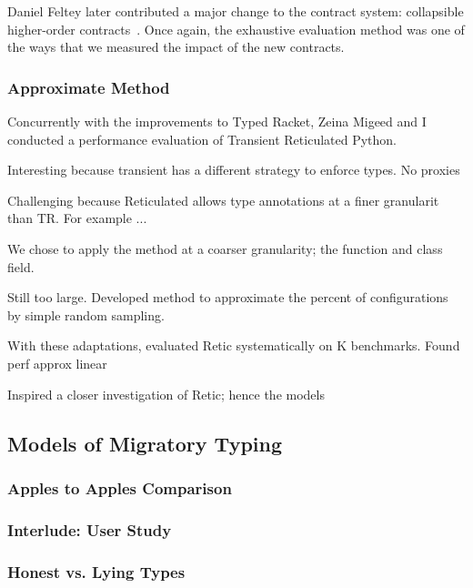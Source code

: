 Daniel Feltey later contributed a major change to the contract system:
 collapsible higher-order contracts~\cite{fgsfs-oopsla-2018}.
Once again, the exhaustive evaluation method was one of the ways that we
 measured the impact of the new contracts.


\subsubsection{Approximate Method}

Concurrently with the improvements to Typed Racket, Zeina Migeed and I conducted
 a performance evaluation of Transient Reticulated Python.


Interesting because transient has a different strategy to enforce types.
No proxies

Challenging because Reticulated allows type annotations at a finer granularit
than TR.
For example ...

We chose to apply the method at a coarser granularity; the function
and class field.

Still too large.
Developed method to approximate the percent of  configurations
by simple random sampling.

With these adaptations, evaluated Retic systematically on K benchmarks.
Found perf approx linear

Inspired a closer investigation of Retic; hence the models


\subsection{Models of Migratory Typing}


\subsubsection{Apples to Apples Comparison}

\subsubsection{Interlude: User Study}


\subsubsection{Honest vs. Lying Types}

